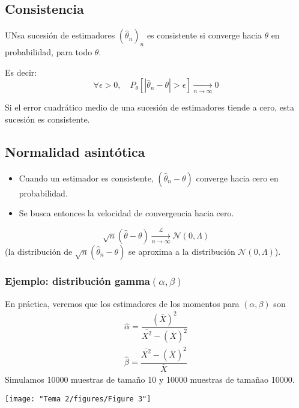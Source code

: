 \subsection{Consistencia}
\begin{tcolorbox}[colback=blue!5!white, colframe=blue!75!black, title=\textbf{Definición}]
UNsa sucesión de estimadores $(\hat{\theta}_n)_n$ es consistente si converge hacia $\theta$ en probabilidad, para todo $\theta$.

Es decir: \[
    \forall \epsilon > 0,\quad P_\theta\left[ |\hat{\theta}_n-\theta| > \epsilon\right] \xrightarrow[n\to \infty]{}0
\] 
\end{tcolorbox}

\begin{tcolorbox}[colback=red!5!white, colframe=red!75!black, title=\textbf{Nota}]
Si el error cuadrático medio de una sucesión de estimadores tiende a cero, esta sucesión es consistente.
\end{tcolorbox}
\subsection{Normalidad asintótica}
\begin{itemize}[label=\textbullet]
    \item Cuando un estimador es consistente, $(\hat{\theta}_n-\theta)$ converge hacia cero en probabilidad.
    \item Se busca entonces la velocidad de convergencia hacia cero.
\end{itemize}
\begin{tcolorbox}[colback=blue!5!white, colframe=blue!75!black, title=\textbf{Un resultado que se puede demostrar para muchos modelos, para el e.m.v:}]
\[
    \sqrt{n} (\hat{\theta}-\theta)\xrightarrow[n\to \infty]{\mathcal{L}}\mathcal{N}(0,\Lambda)
\] (la distribución de $\sqrt{n} (\hat{\theta}_n-\theta)$ se aproxima a la distribución $\mathcal{N}(0,\Lambda)$).
\end{tcolorbox}
\subsubsection*{Ejemplo: distribución gamma$(\alpha, \beta)$}
En práctica, veremos que los estimadores de los momentos para $(\alpha,\beta)$ son \[
\begin{array}{l}
    \hat{\alpha}=\dfrac{(\overline{X})^2}{\overline{X^2}-(\overline{X})^2}\\
\hat{\beta}=\dfrac{\overline{X^2}-(\overline{X})^2}{\overline{X}}
\end{array}
\] 
Simulamos 10000 muestras de tamaño 10 y 10000 muestras de tamañao 10000.
\begin{center}
    \texttt{[image: "Tema 2/figures/Figure 3"]}
\end{center}
